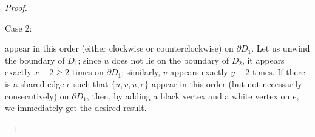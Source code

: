 \begin{proof}
\begin{sideline}{Case 2:}
\begin{center}
\end{center}
appear in this order (either clockwise or counterclockwise) on $\partial D_1$. Let us unwind the boundary of $D_1$; since $u$ does not lie on the boundary of $D_2$, it appears exactly $x-2\ge 2$ times on $\partial D_1$; similarly, $v$ appears exactly $y-2$ times.
\def\myradius{1.3cm}
If there is a shared edge $e$ such that $\{u,v,u,e\}$ appear in this order (but not necessarily consecutively) on $\partial D_1$, then, by adding a black vertex and a white vertex on $e$, we immediately get the desired result.
\begin{center}
\def\picturesetupbase{
\begin{pgfonlayer}{graph edge below}
\fill[disk 1,postaction={draw,surf boundary}] circle(1);
\end{pgfonlayer}
}
\def\picturesetup{
\picturesetupbase
\path (0:1) pic{black vertex} node[right] {$u$};
\path (180:1) pic {black vertex} node[left] {$u$};
\path (-90:1) pic {white vertex} node[below] {$v$};
\path[graph edge={below}{green edge}] (45:1) arc (45:135:1);
}
\end{center}


\end{sideline}
\end{proof}
